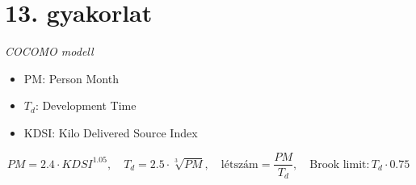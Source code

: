 \documentclass[a4paper]{article}
\begin{document}
\section*{13. gyakorlat}

\textit{COCOMO modell}

\begin{itemize}
    \item PM: Person Month
    \item $T_d$: Development Time
    \item KDSI: Kilo Delivered Source Index
\end{itemize}

$$
PM = 2.4 \cdot KDSI^{1.05},
\quad
T_d = 2.5 \cdot \sqrt[3]{PM},
\quad
\text{létszám} = \dfrac{PM}{T_d},
\quad
\text{Brook limit}: T_d \cdot 0.75
$$
\end{document}
